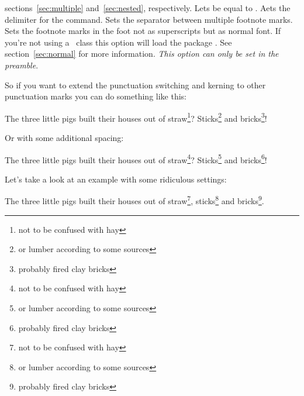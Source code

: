 \documentclass[load-preamble+]{cnltx-doc}
\begin{document}
\begin{options}
    sections~\ref{sec:multiple} and~\ref{sec:nested}, respectively.
    Lets  be equal to .
  \Default{;}
    Aets the delimiter for the  command.
  \Default{,}
    Sets the separator between multiple footnote marks.
    Sets the footnote marks in the foot not as superscripts but as normal
    font.  If you're not using a \KOMAScript\ class this option will load
    the package .  See section~\ref{sec:normal} for more
    information.  \emph{This option can only be set in the preamble}.
\end{options}

So if you want to extend the punctuation switching and kerning to other punctuation
marks you can do something like this:
\begin{example}
  \begin{minipage}{.4\linewidth}
    \noindent The three little pigs built their houses
    out of straw\footnote{not to be confused with hay}?
    Sticks\footnote{or lumber according to some sources}
    and bricks\footnote{probably fired clay bricks}!
  \end{minipage}
\end{example}

Or with some additional spacing:
\begin{example}
  \begin{minipage}{.4\linewidth}
    \noindent The three little pigs built their houses
    out of straw\footnote{not to be confused with hay}?
    Sticks\footnote{or lumber according to some sources}
    and bricks\footnote{probably fired clay bricks}!
  \end{minipage}
\end{example}

Let's take a look at an example with some ridiculous settings:
\begin{example}
  \begin{minipage}{.4\linewidth}
    \noindent The three little pigs built their houses
    out of straw\footnote{not to be confused with hay},
    sticks\footnote{or lumber according to some sources}
    and bricks\footnote{probably fired clay bricks}.
  \end{minipage}
\end{example}
\end{document}
